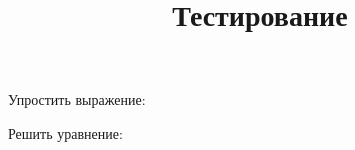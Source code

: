 \title{Тестирование}
\begin{listofex}
	\item Упростить выражение:
	\begin{enumcols}[itemcolumns=1]
		\item {}
		\item {}
	\end{enumcols}
	\item Решить уравнение:
	\begin{enumcols}[itemcolumns=1]
		\item {}
		\item {}
		\item {}
		\item {}
		\item {}
	\end{enumcols}
	\item {}
	\item {}
	\item {}
	\item {}
	\item {}
\end{listofex}